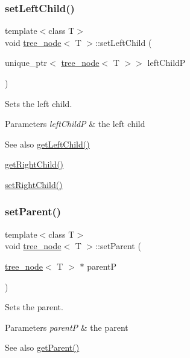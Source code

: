 \subsubsection{\texorpdfstring{set\+Left\+Child()}{setLeftChild()}}
{\footnotesize\ttfamily template$<$class T$>$ \\
void \hyperlink{classtree__node}{tree\+\_\+node}$<$ T $>$\+::set\+Left\+Child (\begin{DoxyParamCaption}\item[{unique\+\_\+ptr$<$ \hyperlink{classtree__node}{tree\+\_\+node}$<$ T $>$$>$}]{left\+ChildP }\end{DoxyParamCaption})\hspace{0.3cm}{\ttfamily [inline]}}

Sets the left child. 
\begin{DoxyParams}{Parameters}
{\em left\+ChildP} & the left child \\
\hline
\end{DoxyParams}
\begin{DoxySeeAlso}{See also}
\hyperlink{classtree__node_ae161b70a3780e0cb3ecd4b57acc9e2d1}{get\+Left\+Child()} 

\hyperlink{classtree__node_a5e584d47f2c11941fe0406836fe50159}{get\+Right\+Child()} 

\hyperlink{classtree__node_afea4c6595dafba65b5c4e59ca3da30f3}{set\+Right\+Child()} 
\end{DoxySeeAlso}
\mbox{\label{classtree__node_a1fe75baae3a5d9caa9cb886c54c291e2}} 
\subsubsection{\texorpdfstring{set\+Parent()}{setParent()}}
{\footnotesize\ttfamily template$<$class T$>$ \\
void \hyperlink{classtree__node}{tree\+\_\+node}$<$ T $>$\+::set\+Parent (\begin{DoxyParamCaption}\item[{\hyperlink{classtree__node}{tree\+\_\+node}$<$ T $>$ $\ast$}]{parentP }\end{DoxyParamCaption})\hspace{0.3cm}{\ttfamily [inline]}}

Sets the parent. 
\begin{DoxyParams}{Parameters}
{\em parentP} & the parent \\
\hline
\end{DoxyParams}
\begin{DoxySeeAlso}{See also}
\hyperlink{classtree__node_aa17e609b57f77bb5446d83c964409ac4}{get\+Parent()} 
\end{DoxySeeAlso}
\mbox{\label{classtree__node_afea4c6595dafba65b5c4e59ca3da30f3}} 
